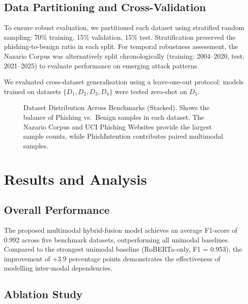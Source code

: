 \documentclass[conference]{IEEEtran}
\begin{document}
\subsection{Data Partitioning and Cross-Validation}

To ensure robust evaluation, we partitioned each dataset using stratified random sampling: 70\% training, 15\% validation, 15\% test. Stratification preserved the phishing-to-benign ratio in each split. For temporal robustness assessment, the Nazario Corpus was alternatively split chronologically (training: 2004--2020, test: 2021--2025) to evaluate performance on emerging attack patterns.

We evaluated cross-dataset generalisation using a leave-one-out protocol: models trained on datasets $\{D_1, D_2, D_3, D_4\}$ were tested zero-shot on $D_5$.

\begin{figure}[t]
    \centering
    \caption{Dataset Distribution Across Benchmarks (Stacked). Shows the balance of Phishing vs.\ Benign samples in each dataset. The Nazario Corpus and UCI Phishing Websites provide the largest sample counts, while PhishIntention contributes paired multimodal samples.}
    \label{fig:datasets}
\end{figure}

\section{Results and Analysis}

\subsection{Overall Performance}

The proposed multimodal hybrid-fusion model achieves an average F1-score of 0.992 across five benchmark datasets, outperforming all unimodal baselines. Compared to the strongest unimodal baseline (RoBERTa-only, F1 = 0.953), the improvement of +3.9 percentage points demonstrates the effectiveness of modelling inter-modal dependencies.

\subsection{Ablation Study}
\end{document}
